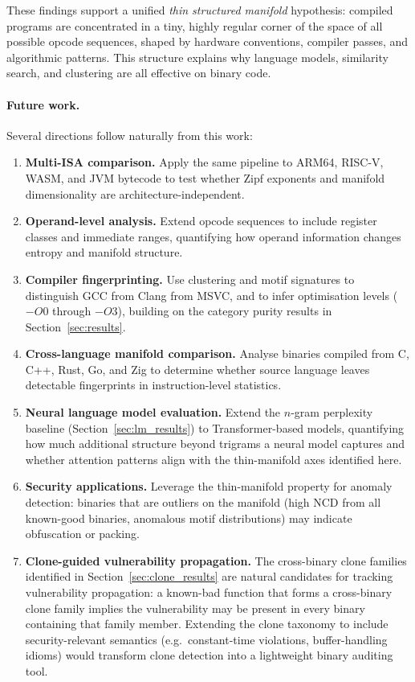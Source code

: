 \documentclass[10pt,twocolumn]{article}
\begin{document}
These findings support a unified \emph{thin structured manifold} hypothesis:
compiled programs are concentrated in a tiny, highly regular corner of the
space of all possible opcode sequences, shaped by hardware conventions,
compiler passes, and algorithmic patterns.  This structure explains why language
models, similarity search, and clustering are all effective on binary code.

\paragraph{Future work.}
Several directions follow naturally from this work:

\begin{enumerate}
  \item \textbf{Multi-ISA comparison.}  Apply the same pipeline to ARM64,
        RISC-V, WASM, and JVM bytecode to test whether Zipf exponents and
        manifold dimensionality are architecture-independent.
  \item \textbf{Operand-level analysis.}  Extend opcode sequences to include
        register classes and immediate ranges, quantifying how operand
        information changes entropy and manifold structure.
  \item \textbf{Compiler fingerprinting.}  Use clustering and motif signatures
        to distinguish GCC from Clang from MSVC, and to infer optimisation
        levels ($-O0$ through $-O3$), building on the category purity results
        in Section~\ref{sec:results}.
  \item \textbf{Cross-language manifold comparison.}  Analyse binaries compiled
        from C, C++, Rust, Go, and Zig to determine whether source language
        leaves detectable fingerprints in instruction-level statistics.
  \item \textbf{Neural language model evaluation.}  Extend the $n$-gram
        perplexity baseline (Section~\ref{sec:lm_results}) to Transformer-based
        models, quantifying how much additional structure beyond trigrams a
        neural model captures and whether attention patterns align with the
        thin-manifold axes identified here.
  \item \textbf{Security applications.}  Leverage the thin-manifold property
        for anomaly detection: binaries that are outliers on the manifold (high
        NCD from all known-good binaries, anomalous motif distributions) may
        indicate obfuscation or packing.
  \item \textbf{Clone-guided vulnerability propagation.}  The cross-binary
        clone families identified in Section~\ref{sec:clone_results} are
        natural candidates for tracking vulnerability propagation: a known-bad
        function that forms a cross-binary clone family implies the vulnerability
        may be present in every binary containing that family member.  Extending
        the clone taxonomy to include security-relevant semantics (e.g.\
        constant-time violations, buffer-handling idioms) would transform clone
        detection into a lightweight binary auditing tool.
\end{enumerate}



\end{document}
